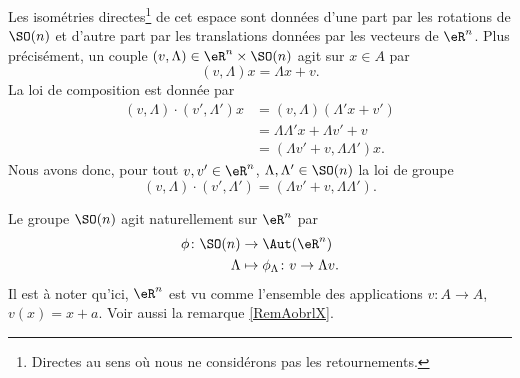 Les isométries directes\footnote{Directes au sens où nous ne considérons pas les retournements.} de cet espace sont données d'une part par les rotations de \( \SO(n)\) et d'autre part par les translations données par les vecteurs de \( \eR^n\). Plus précisément, un couple \( (v,\Lambda)\in \eR^n\times\SO(n)\) agit sur \( x\in A\) par
\begin{equation}
    (v,\Lambda)x=\Lambda x+v.
\end{equation}
La loi de composition est donnée par
\begin{subequations}
    \begin{align}
        (v,\Lambda)\cdot(v',\Lambda')x&=(v,\Lambda)(\Lambda'x+v')\\
        &=\Lambda\Lambda'x+\Lambda v'+v\\
        &=(\Lambda v'+v,\Lambda\Lambda')x.
    \end{align}
\end{subequations}
Nous avons donc, pour tout \( v,v'\in \eR^n\), \( \Lambda,\Lambda'\in\SO(n)\) la loi de groupe
\begin{equation}    \label{EqDiHcut}
        (v,\Lambda)\cdot(v',\Lambda')=(\Lambda v'+v,\Lambda\Lambda').
\end{equation}
    
Le groupe \( \SO(n)\) agit naturellement sur \( \eR^n\) par
\begin{equation}
    \begin{aligned}
        \phi\colon \SO(n)&\to \Aut(\eR^n) \\
        \Lambda&\mapsto \phi_{\Lambda}\colon v\to \Lambda v. 
    \end{aligned}
\end{equation}
Il est à noter qu'ici, \( \eR^n\) est vu comme l'ensemble des applications \( v\colon A\to A\), \( v(x)=x+a\). Voir aussi la remarque \ref{RemAobrlX}.

